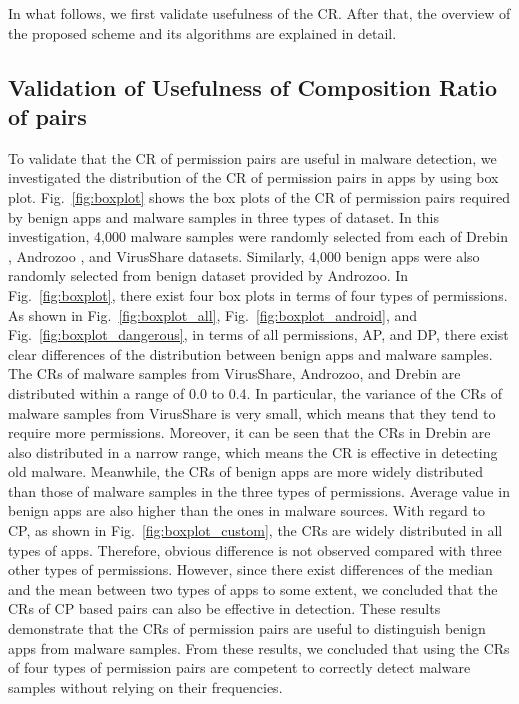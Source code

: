 \documentclass{ieeeaccess}
\newcommand{\myfigurename}{Fig.}
\begin{document}
In what follows, we first validate usefulness of the CR.  
After that, the overview of the proposed scheme and its algorithms are explained in detail.

\subsection{Validation of Usefulness of Composition Ratio of pairs} 
To validate that the CR of permission pairs are useful in malware detection, we investigated the distribution of the CR of permission pairs in apps by using box plot.
\myfigurename~\ref{fig:boxplot} shows the box plots of the CR of permission pairs required by benign apps and malware samples in three types of dataset.
In this investigation, 4,000 malware samples were randomly selected from each of Drebin \cite{arp2014drebin}, Androzoo \cite{allix2016androzoo}, and VirusShare \cite{virusshare} datasets.
Similarly, 4,000 benign apps were also randomly selected from benign dataset provided by Androzoo.
In \myfigurename~\ref{fig:boxplot}, there exist four box plots in terms of four types of permissions.
As shown in \myfigurename~\ref{fig:boxplot_all}, \myfigurename~\ref{fig:boxplot_android}, and \myfigurename~\ref{fig:boxplot_dangerous}, in terms of all permissions, AP, and DP, there exist clear differences of the distribution between benign apps and malware samples.  
The CRs of malware samples from VirusShare, Androzoo, and Drebin are distributed within a range of 0.0 to 0.4.
In particular, the variance of the CRs of malware samples from VirusShare is very small, which means that they tend to require more permissions.
Moreover, it can be seen that the CRs in Drebin are also distributed in a narrow range, which means the CR is effective in detecting old malware.
Meanwhile, the CRs of benign apps are more widely distributed than those of malware samples in the three types of permissions.
Average value in benign apps are also higher than the ones in malware sources.
With regard to CP, as shown in \myfigurename~\ref{fig:boxplot_custom}, the CRs are widely distributed in all types of apps.
Therefore, obvious difference is not observed compared with three other types of permissions.
However, since there exist differences of the median and the mean between two types of apps to some extent, we concluded that the CRs of CP based pairs can also be effective in detection.
These results demonstrate that the CRs of permission pairs are useful to distinguish benign apps from malware samples.
From these results, we concluded that using the CRs of four types of permission pairs are competent to correctly detect malware samples without relying on their frequencies.
\end{document}
